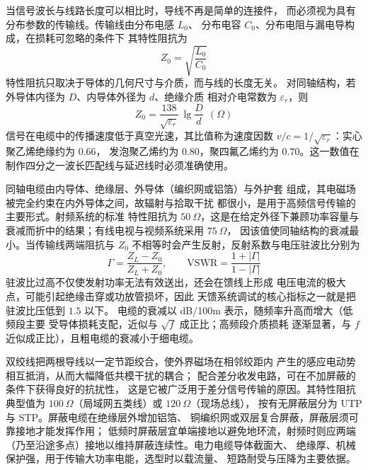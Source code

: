 当信号波长与线路长度可以相比时，导线不再是简单的连接件，
而必须视为具有分布参数的传输线。传输线由分布电感 $L_0$、
分布电容 $C_0$、分布电阻与漏电导构成，在损耗可忽略的条件下
其特性阻抗为
\begin{equation}
Z_0 = \sqrt{\frac{L_0}{C_0}}
\end{equation}
特性阻抗只取决于导体的几何尺寸与介质，而与线的长度无关。
对同轴结构，若外导体内径为 $D$、内导体外径为 $d$、绝缘介质
相对介电常数为 $\varepsilon_r$，则
\begin{equation}
Z_0 = \frac{138}{\sqrt{\varepsilon_r}}\,\lg\frac{D}{d}\ \ (\Omega)
\end{equation}
信号在电缆中的传播速度低于真空光速，其比值称为速度因数
$v/c = 1/\sqrt{\varepsilon_r}$：实心聚乙烯绝缘约为 $0.66$，
发泡聚乙烯约为 $0.80$，聚四氟乙烯约为 $0.70$。这一数值在
制作四分之一波长匹配线与延迟线时必须准确使用。

同轴电缆由内导体、绝缘层、外导体（编织网或铝箔）与外护套
组成，其电磁场被完全约束在内外导体之间，故辐射与拾取干扰
都很小，是用于高频信号传输的主要形式。射频系统的标准
特性阻抗为 $50\ \Omega$，这是在给定外径下兼顾功率容量与
衰减而折中的结果；有线电视与视频系统采用 $75\ \Omega$，
因该值使同轴结构的衰减最小。当传输线两端阻抗与 $Z_0$
不相等时会产生反射，反射系数与电压驻波比分别为
\[
\Gamma = \frac{Z_L - Z_0}{Z_L + Z_0}, \qquad
\mathrm{VSWR} = \frac{1+|\Gamma|}{1-|\Gamma|}
\]
驻波比过高不仅使发射功率无法有效送出，还会在馈线上形成
电压电流的极大点，可能引起绝缘击穿或功放管损坏，因此
天馈系统调试的核心指标之一就是把驻波比压低到 $1.5$ 以下。
电缆的衰减以 dB/100m 表示，随频率升高而增大（低频段主要
受导体损耗支配，近似与 $\sqrt{f}$ 成正比；高频段介质损耗
逐渐显著，与 $f$ 近似成正比），且粗电缆的衰减小于细电缆。

双绞线把两根导线以一定节距绞合，使外界磁场在相邻绞距内
产生的感应电动势相互抵消，从而大幅降低共模干扰的耦合；
配合差分收发电路，可在不加屏蔽的条件下获得良好的抗扰性，
这是它被广泛用于差分信号传输的原因。其特性阻抗典型值为
$100\ \Omega$（局域网五类线）或 $120\ \Omega$（现场总线），
按有无屏蔽层分为 UTP 与 STP。屏蔽电缆在绝缘层外增加铝箔、
铜编织网或双层复合屏蔽，屏蔽层须可靠接地才能发挥作用；
低频时屏蔽层宜单端接地以避免地环流，射频时则应两端
（乃至沿途多点）接地以维持屏蔽连续性。电力电缆导体截面大、
绝缘厚、机械保护强，用于传输大功率电能，选型时以载流量、
短路耐受与压降为主要依据。


